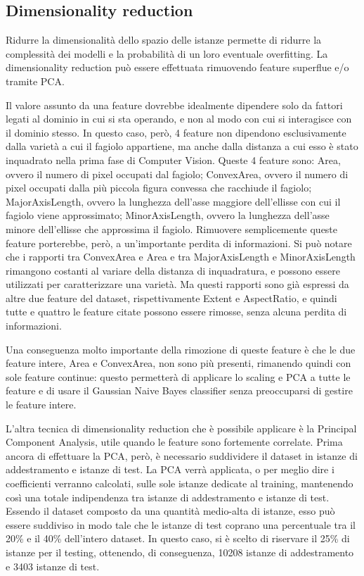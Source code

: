 \subsection{Dimensionality reduction}
Ridurre la dimensionalità dello spazio delle istanze permette di ridurre la
complessità dei modelli e la probabilità di un loro eventuale overfitting.
La dimensionality reduction può essere effettuata rimuovendo feature superflue
e/o tramite PCA.

Il valore assunto da una feature dovrebbe idealmente dipendere solo
da fattori legati al dominio in cui si sta operando, e non al modo con cui 
si interagisce con il dominio stesso. 
In questo caso, però, 4 feature non dipendono esclusivamente dalla varietà a cui
il fagiolo appartiene, ma anche dalla distanza a cui esso è stato
inquadrato nella prima fase di Computer Vision. Queste 4 feature sono: 
Area, ovvero il numero di pixel occupati dal fagiolo; ConvexArea, ovvero il
numero di pixel occupati dalla più piccola figura convessa che racchiude
il fagiolo; MajorAxisLength, ovvero la lunghezza dell'asse maggiore dell'ellisse
con cui il fagiolo viene approssimato; MinorAxisLength, ovvero la lunghezza
dell'asse minore dell'ellisse che approssima il fagiolo.
Rimuovere semplicemente queste feature porterebbe, però, a un'importante perdita
di informazioni. Si può notare che i rapporti tra ConvexArea e Area
e tra MajorAxisLength e MinorAxisLength rimangono costanti al variare della
distanza di inquadratura, e possono essere utilizzati per caratterizzare una
varietà.
Ma questi rapporti sono già espressi da altre due feature del dataset,
rispettivamente Extent e AspectRatio, e quindi tutte e quattro le feature
citate possono essere rimosse, senza alcuna perdita di informazioni.

Una conseguenza molto importante della rimozione di queste feature è che le
due feature intere, Area e ConvexArea, non sono più presenti, rimanendo quindi con sole
feature continue: questo permetterà di applicare lo scaling e PCA a tutte le
feature e di usare il Gaussian Naive Bayes classifier senza preoccuparsi di
gestire le feature intere.

L'altra tecnica di dimensionality reduction che è possibile applicare è
la Principal Component Analysis, utile quando le feature sono fortemente correlate.
Prima ancora di effettuare la PCA, però, è necessario suddividere il dataset
in istanze di addestramento e istanze di test. La PCA verrà applicata, o per meglio
dire i coefficienti verranno calcolati, sulle sole istanze dedicate 
al training, mantenendo così una totale indipendenza tra istanze di addestramento
e istanze di test.
Essendo il dataset composto da una quantità medio-alta di istanze,
esso può essere suddiviso in
modo tale che le istanze di test coprano una percentuale tra il 20\% e 
il 40\% dell'intero dataset.
In questo caso, si è scelto di riservare il 25\% di istanze per il testing,
ottenendo, di conseguenza, 10208 istanze di addestramento e 3403 istanze di test.

